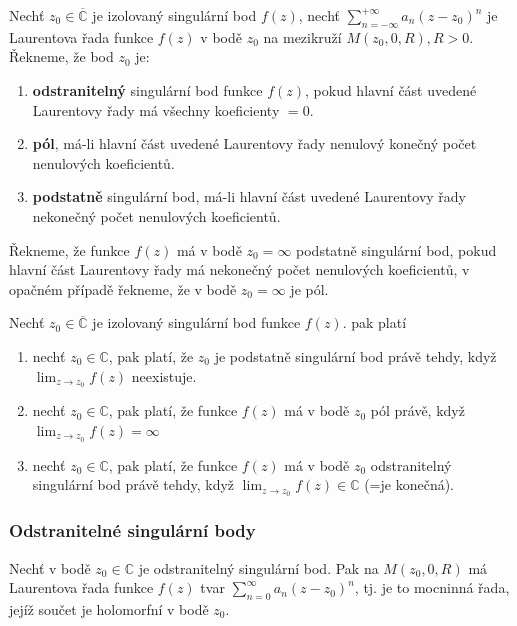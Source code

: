 \begin{definition}
Nechť $z_0\in \overline{\mathbb{C}}$ je izolovaný  singulární bod $f(z)$, nechť $\sum_{n=-\infty}^{+\infty}a_n(z-z_0)^n$ je Laurentova řada funkce $f(z)$ v bodě $z_0$ na mezikruží $M(z_0,0,R), R>0$. Řekneme, že bod $z_0$ je: 
\begin{enumerate}
\item \textbf{odstranitelný} singulární bod funkce $f(z)$, pokud hlavní část uvedené Laurentovy řady má všechny koeficienty $=0$.
\item \textbf{pól}, má-li hlavní část uvedené Laurentovy řady nenulový konečný počet nenulových koeficientů.
\item \textbf{podstatně} singulární bod, má-li hlavní část uvedené Laurentovy řady nekonečný počet nenulových koeficientů.
\end{enumerate}
\end{definition}

\begin{definition}
Řekneme, že funkce $f(z)$ má v bodě $z_0=\infty$ podstatně singulární bod, pokud hlavní část Laurentovy řady má nekonečný počet nenulových koeficientů, v opačném případě řekneme, že v bodě $z_0=\infty$ je pól.
\end{definition}

\begin{theorem}
Nechť $z_0\in \overline{\mathbb{C}}$ je izolovaný singulární bod funkce $f(z)$. pak platí
\begin{enumerate}
\item nechť $z_0\in\mathbb{C}$, pak platí, že $z_0$ je podstatně singulární bod právě tehdy, když $\lim_{z\rightarrow z_0}f(z)$ neexistuje.
\item nechť $z_0\in\mathbb{C}$, pak platí, že funkce $f(z)$ má v bodě $z_0$ pól právě, když $\lim_{z\rightarrow z_0}f(z)=\infty$
\item nechť $z_0\in\mathbb{C}$, pak platí, že funkce $f(z)$ má v bodě $z_0$ odstranitelný singulární bod právě tehdy, když $\lim_{z\rightarrow z_0}f(z)\in\mathbb{C}$ (=je konečná).
\end{enumerate}
\end{theorem}

\subsubsection{Odstranitelné singulární body}
Nechť v bodě $z_0\in\mathbb{C}$ je odstranitelný singulární bod. Pak na $M(z_0,0,R)$ má Laurentova řada funkce $f(z)$ tvar $\sum_{n=0}^{\infty}a_n(z-z_0)^n$, tj. je to mocninná řada, jejíž součet je holomorfní v bodě $z_0$. 

